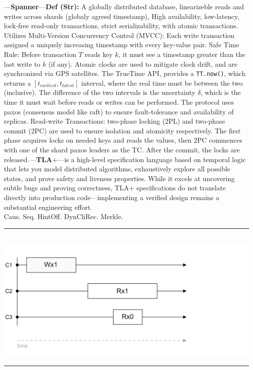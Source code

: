 \begin{multicols}{2}

\noindent
---\textbf{Spanner}---\textbf{Def (Str):} A globally distributed database, linearizeble reads and writes across shards (globaly agreed timestamp), High availability, low-latency, lock-free read-only transactions, strict serializability, with atomic transactions.
Utilizes Multi-Version Concurrency Control (MVCC): Each write transaction assigned a uniquely increasing timestamp with every key-value pair.
Safe Time Rule: Before transaction $T$ reads key $k$, it must see a timestamp greater than the last write to $k$ (if any).
Atomic clocks are used to mitigate clock drift, and are synchronized via GPS satellites. The TrueTime API, provides a \texttt{TT.now()}, which returns  a $[t_{earliest}, t_{latest}]$ interval, where the real time must be between the two (inclusive).
The difference of the two intervals is the uncertainty $\delta$, which is the time it must wait before reads or writes can be performed.
The protocol uses paxos (consensus model like raft) to ensure fault-tolerance and availability of replicas. Read-write Transactions:
two-phase locking (2PL) and two-phase commit (2PC) are used to ensure isolation and atomicity respectively. The first phase acquires locks on needed keys and reads the values, then 2PC commences with one of the shard paxos leaders as the TC.
After the commit, the locks are released.---\textbf{TLA$+$}---is a high-level specification language based on temporal logic that lets you model distributed
algorithms, exhaustively explore all possible states, and prove safety and liveness properties. While
it excels at uncovering subtle bugs and proving correctness, TLA$+$ specifications do not translate
directly into production code—implementing a verified design remains a substantial engineering
effort.\\
Caus. Seq. HintOff. DynCliRec. Merkle.

\vspace{13em}


\noindent
\rule{\linewidth}{0.4pt}\\
\hspace{-1.5em}
\includegraphics[width=\linewidth]{Sections/consist/cas1.png}\\
\noindent
\rule{\linewidth}{0.4pt}\\


\end{multicols}

